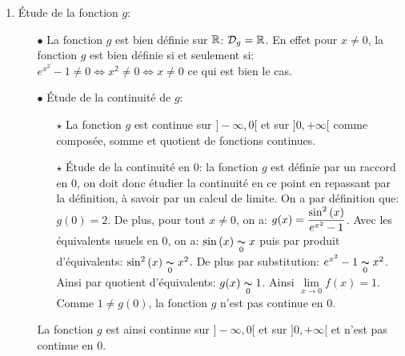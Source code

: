 \documentclass[a4paper, 11pt,reqno]{article}
\begin{document}
\begin{correction}
\begin{enumerate}
		\item \'Etude de la fonction $g$:
		      \begin{itemize}
			      \item[$\bullet$] La fonction $g$ est bien d\'efinie sur $\mathbb{R}$: $\mathcal{D}_g=\mathbb{R}$. En effet pour $x\not= 0$, la fonction $g$ est bien d\'efinie si et seulement si: $e^{x^2}-1\not= 0\Leftrightarrow x^2\not= 0\Leftrightarrow x\not= 0$ ce qui est bien le cas.
			      \item[$\bullet$] \'Etude de la continuit\'e de $g$:
			            \begin{itemize}
				            \item[$\star$] La fonction $g$ est continue sur $\rbrack -\infty,0\lbrack$ et sur $\rbrack 0,+\infty\lbrack$ comme compos\'ee, somme et quotient de fonctions continues.
				            \item[$\star$] \'Etude de la continuit\'e en 0: la fonction $g$ est d\'efinie par un raccord en 0, on doit donc \'etudier la continuit\'e en ce point en repassant par la d\'efinition, \`{a} savoir par un calcul de limite. On a par d\'efinition que: $g(0)=2$. De plus, pour tout $x\not= 0$, on a: $g(x)=\displaystyle\frac{\sin^2{(x)}}{e^{x^2}-1}$. Avec les \'equivalents usuels en 0, on a: $\sin{(x)}\underset{0}{\thicksim} x$ puis par produit d'\'equivalents: $\sin^2{(x)}\underset{0}{\thicksim} x^2$. De plus par substitution: $e^{x^2}-1\underset{0}{\thicksim}  x^2$. Ainsi par quotient d'\'equivalents: $g(x)\underset{0}{\thicksim} 1$. Ainsi $\lim\limits_{x\to 0} f(x)=1$. Comme $1\not= g(0)$, la fonction $g$ n'est pas continue en 0.
			            \end{itemize}
			            La fonction $g$ est ainsi continue sur $\rbrack -\infty,0\lbrack$ et sur $\rbrack 0,+\infty\lbrack$ et n'est pas continue en 0.
		      \end{itemize}
	\end{enumerate}
\end{correction}
\end{document}
